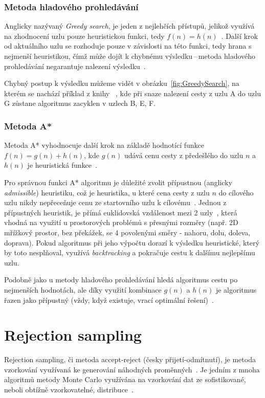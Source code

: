 \subsubsection*{\textbullet Metoda hladového prohledávání}
Anglicky nazývaný \textit{Greedy search}, je jeden z nejlehčích přístupů, jelikož využívá na zhodnocení uzlu pouze heuristickou funkci, tedy ${f(n) = h(n)}$~\cite{AI-Modern_approach}. Další krok od aktuálního uzlu se rozhoduje pouze v závislosti na této funkci, tedy hrana s nejmenší heuristikou, čímž může dojít k chybnému výsledku\,--\,metoda hladového prohledávání negarantuje nalezení výsledku~\cite{poole2023artificial}. 

Chybný postup k výsledku můžeme vidět v obrázku~\ref{fig:GreedySearch}, na kterém se nachází příklad z knihy ~\cite{poole2023artificial}, kde při snaze nalezení cesty z uzlu A do uzlu G zůstane algoritmus zacyklen v uzlech B, E, F.

\subsubsection*{\textbullet Metoda A*}
Metoda A* vyhodnocuje další krok na základě hodnotící funkce ${f(n) = g(n) + h(n)}$, kde ${g(n)}$ udává cenu cesty z předešlého do uzlu ${n}$ a ${h(n)}$ je heuristická funkce~\cite{AI-Modern_approach}. 

Pro správnou funkci A* algoritmu je důležité zvolit přípustnou (anglicky \textit{admissible}) heuristiku, což je heuristika, u které cena cesty z uzlu ${n}$ do cílového uzlu nikdy nepřeceňuje cenu ze startovního uzlu k cílovému~\cite{AI-Modern_approach, izu}. Jednou z přípustných heuristik, je přímá euklidovská vzdálenost mezi 2 uzly~\cite{poole2023artificial}, která vhodná na využití u prostorových problémů s přesnými rozměry (např. 2D mřížkový prostor, bez překážek, se 4 povolenými směry - nahoru, dolu, doleva, doprava). Pokud algoritmus při jeho výpočtu dorazí k výsledku heuristické, který by toto nesplňoval, využívá \textit{backtracking} a pokračuje cestu k dalšímu nejlepšímu uzlu.

Podobně jako u metody hladového prohledávání hledá algoritmus cestu po nejmenších hodnotách, ale díky využití kombinace ${g(n)}$ a ${h(n)}$ je algoritmus řazen jako přípustný (vždy, když existuje, vrací optimální řešení)~\cite{poole2023artificial}.
    
\section{Rejection sampling}
Rejection sampling, či metoda accept-reject (česky přijetí-odmítnutí), je metoda vzorkování využívaná ke generování náhodných proměnných~\cite{thomopoulos2012essentials}. Je jedním z mnoha algoritmů metody Monte Carlo využívána na vzorkování dat ze sofistikované, neboli obtížně vzorkovatelné, distribuce~\cite{Sachdeva_2021}.

